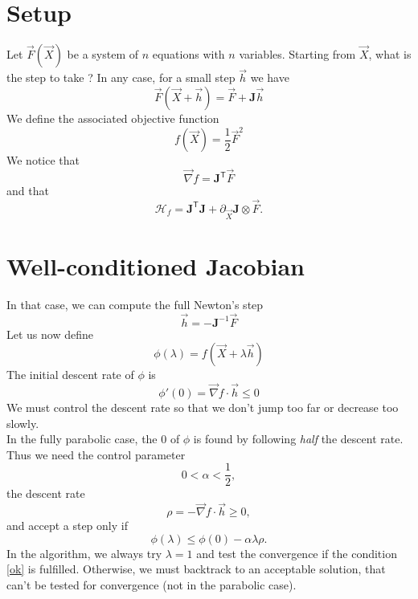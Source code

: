 \documentclass[aps,twocolumn]{revtex4}
\newcommand{\mymat}[1]{\boldsymbol{#1}}
\newcommand{\mytrn}[1]{{#1}^{\mathsf{T}}}
\newcommand{\mygrad}{\vec{\nabla}}
\newcommand{\myhess}{\mathcal{H}}
\begin{document}
\section{Setup}
Let $\vec{F}\left(\vec{X}\right)$ be a system of $n$ equations with $n$ variables.
Starting from $\vec{X}$, what is the step to take ?
In any case, for a small step $\vec{h}$ we have
\begin{equation}
	\vec{F}\left(\vec{X}+\vec{h}\right) = \vec{F} + \mymat{J} \vec{h}
\end{equation}
We define the associated objective function
\begin{equation}
	f\left(\vec{X}\right) = \frac{1}{2} \vec{F}^2
\end{equation}
We notice that
\begin{equation}
	\mygrad f = \mytrn{\mymat{J}}\vec{F}
\end{equation}
and that
\begin{equation}
	\myhess_f = \mytrn{\mymat{J}}\mymat{J} + \partial_{\vec{X}}\mymat{J} \otimes \vec{F}.
\end{equation}


\section{Well-conditioned Jacobian}
In that case, we can compute the full Newton's step
\begin{equation}
	\vec{h} = - \mymat{J}^{-1} \vec{F}
\end{equation}
Let us now define
\begin{equation}
	\phi(\lambda) =  f \left(\vec{X} + \lambda \vec{h}\right)
\end{equation}
The initial descent rate of $\phi$ is
\begin{equation}
	\phi'(0) = \mygrad f \cdot \vec{h} \leq 0
\end{equation}
We must control the descent rate so that we don't jump too far or decrease too slowly.\\
In the fully parabolic case, the 0 of $\phi$ is found by following \emph{half} the descent rate.
Thus we need the control parameter
\begin{equation}
	0 < \alpha < \frac{1}{2},
\end{equation}
the descent rate
\begin{equation}
	\rho = - \mygrad f \cdot \vec{h} \geq 0,
\end{equation}
and accept a step only if
\begin{equation}
	\label{ok}
	\phi(\lambda) \leq \phi(0) - \alpha \lambda \rho.
\end{equation}
In the algorithm, we always try $\lambda=1$ and test the convergence
if the condition \eqref{ok} is fulfilled.
Otherwise, we must backtrack to an acceptable solution, that can't be tested for convergence (not in
the parabolic case).
\end{document}
